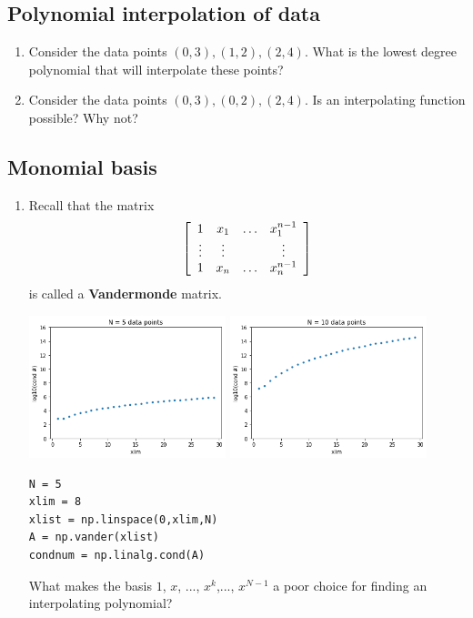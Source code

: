 \documentclass[12pt,letterpaper,noanswers]{exam}
\begin{document}
\subsection*{Polynomial interpolation of data}

\begin{enumerate}
\item Consider the data points $(0,3), (1,2), (2,4)$.  What is the lowest degree polynomial that will interpolate these points?
\vspace{0.6in}

\item Consider the data points $(0,3), (0,2), (2,4)$.  Is an interpolating function possible?  Why not?
\vspace{0.6in}

\end{enumerate}

\subsection*{Monomial basis}

\begin{enumerate}[resume]
\item Recall that the matrix \[\left[\begin{array}{c c c c}
1 & x_1 & \hdots & x_1^{n-1} \\
\vdots & \vdots & & \vdots \\
1 & x_n & \hdots & x_n^{n-1}
\end{array}\right]\] is called a \textbf{Vandermonde} matrix.  


\includegraphics[width=0.45\textwidth]{img/Class08vandermonde5.png}
\includegraphics[width=0.45\textwidth]{img/Class08vandermonde10.png}

\begin{verbatim}
N = 5
xlim = 8
xlist = np.linspace(0,xlim,N)
A = np.vander(xlist)
condnum = np.linalg.cond(A)
\end{verbatim}

What makes the basis $1$, $x$, ..., $x^k$,..., $x^{N-1}$ a poor choice for finding an interpolating polynomial?
\vspace{1in}
\end{enumerate}
\end{document}
